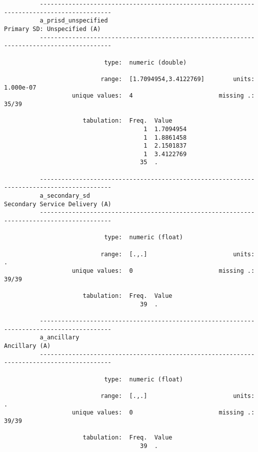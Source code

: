 \documentclass{article}
\begin{document}
\begin{verbatim}
          ------------------------------------------------------------------------------------------
          a_prisd_unspecified                                            Primary SD: Unspecified (A)
          ------------------------------------------------------------------------------------------
          
                            type:  numeric (double)
          
                           range:  [1.7094954,3.4122769]        units:  1.000e-07
                   unique values:  4                        missing .:  35/39
          
                      tabulation:  Freq.  Value
                                       1  1.7094954
                                       1  1.8861458
                                       1  2.1501837
                                       1  3.4122769
                                      35  .
          
          ------------------------------------------------------------------------------------------
          a_secondary_sd                                              Secondary Service Delivery (A)
          ------------------------------------------------------------------------------------------
          
                            type:  numeric (float)
          
                           range:  [.,.]                        units:  .
                   unique values:  0                        missing .:  39/39
          
                      tabulation:  Freq.  Value
                                      39  .
          
          ------------------------------------------------------------------------------------------
          a_ancillary                                                                  Ancillary (A)
          ------------------------------------------------------------------------------------------
          
                            type:  numeric (float)
          
                           range:  [.,.]                        units:  .
                   unique values:  0                        missing .:  39/39
          
                      tabulation:  Freq.  Value
                                      39  .
          

\end{verbatim}
\end{document}
